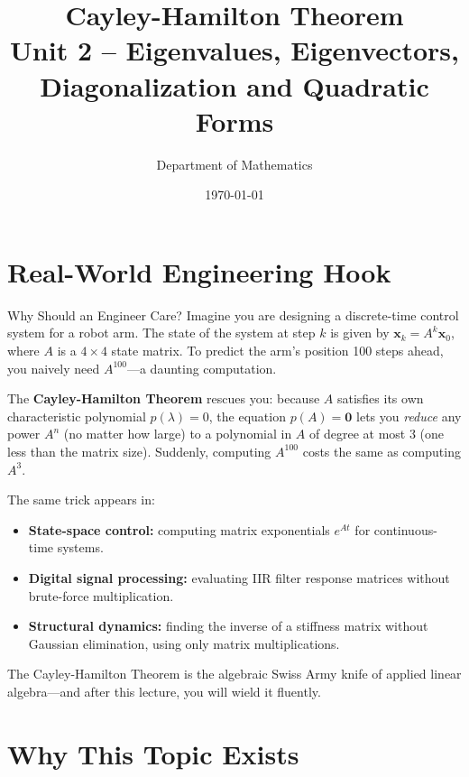\documentclass[12pt,a4paper]{article}
\title{\textbf{Cayley-Hamilton Theorem} \\ \large Unit 2 -- Eigenvalues, Eigenvectors, Diagonalization and Quadratic Forms}
\author{Department of Mathematics}
\date{\today}
\begin{document}
\maketitle
\tableofcontents
\newpage

\section{Real-World Engineering Hook}

\begin{curiositybox}{Why Should an Engineer Care?}
Imagine you are designing a discrete-time control system for a robot arm.
The state of the system at step $k$ is given by $\mathbf{x}_{k} = A^{k}\mathbf{x}_{0}$,
where $A$ is a $4\times 4$ state matrix.
To predict the arm's position 100 steps ahead, you naively need $A^{100}$---a
daunting computation.

The \textbf{Cayley-Hamilton Theorem} rescues you: because $A$ satisfies its own
characteristic polynomial $p(\lambda) = 0$, the equation $p(A) = \mathbf{0}$
lets you \emph{reduce} any power $A^{n}$ (no matter how large) to a polynomial
in $A$ of degree at most $3$ (one less than the matrix size).
Suddenly, computing $A^{100}$ costs the same as computing $A^{3}$.

The same trick appears in:
\begin{itemize}
  \item \textbf{State-space control:} computing matrix exponentials $e^{At}$ for
        continuous-time systems.
  \item \textbf{Digital signal processing:} evaluating IIR filter response matrices
        without brute-force multiplication.
  \item \textbf{Structural dynamics:} finding the inverse of a stiffness matrix
        without Gaussian elimination, using only matrix multiplications.
\end{itemize}
The Cayley-Hamilton Theorem is the algebraic Swiss Army knife of applied linear
algebra---and after this lecture, you will wield it fluently.
\end{curiositybox}

\section{Why This Topic Exists}
\end{document}
